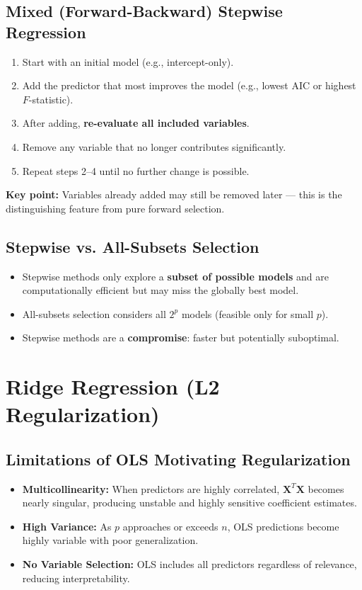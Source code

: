 \documentclass{article}
\begin{document}
\subsection{Mixed (Forward-Backward) Stepwise Regression}
\begin{enumerate}
    \item Start with an initial model (e.g., intercept-only).
    \item Add the predictor that most improves the model (e.g., lowest AIC or highest $F$-statistic).
    \item After adding, \textbf{re-evaluate all included variables}.
    \item Remove any variable that no longer contributes significantly.
    \item Repeat steps 2--4 until no further change is possible.
\end{enumerate}
\noindent\textbf{Key point:} Variables already added may still be removed later --- this is the distinguishing feature from pure forward selection.

\subsection{Stepwise vs. All-Subsets Selection}
\begin{itemize}
    \item Stepwise methods only explore a \textbf{subset of possible models} and are computationally efficient but may miss the globally best model.
    \item All-subsets selection considers all $2^p$ models (feasible only for small $p$).
    \item Stepwise methods are a \textbf{compromise}: faster but potentially suboptimal.
\end{itemize}

\newpage
\section{Ridge Regression (L2 Regularization)}

\subsection{Limitations of OLS Motivating Regularization}
\begin{itemize}
    \item \textbf{Multicollinearity:} When predictors are highly correlated, $\mathbf{X}^T\mathbf{X}$ becomes nearly singular, producing unstable and highly sensitive coefficient estimates.
    \item \textbf{High Variance:} As $p$ approaches or exceeds $n$, OLS predictions become highly variable with poor generalization.
    \item \textbf{No Variable Selection:} OLS includes all predictors regardless of relevance, reducing interpretability.
\end{itemize}
\end{document}
